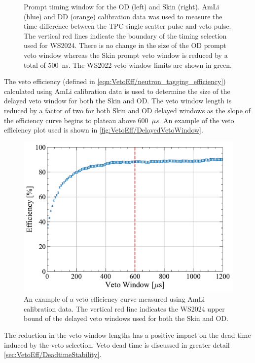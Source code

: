 \begin{figure}[!ht]
\begin{subfigure}[b]{0.49\textwidth}
		\caption{}
        \label{fig:VetoEff/skin_prompt_window}
	\end{subfigure}
	\caption{Prompt timing window for the OD (left) and Skin (right). %
    AmLi (blue) and DD (orange) calibration data was used to measure the time difference between the TPC single scatter pulse and veto pulse. 
    The vertical red lines indicate the boundary of the timing selection used for WS2024. There is no change in the size of the OD prompt veto window whereas the Skin prompt veto window is reduced by a total of 500~ns. The WS2022 veto window limits are shown in green.}
	\label{fig:VetoEff/veto_prompt_windows}
\end{figure}

The veto efficiency (defined in \ref{eqn:VetoEff/neutron_tagging_efficiency}) calculated using AmLi calibration data is used to determine the size of the delayed veto window for both the Skin and OD. The veto window length is reduced by a factor of two for both Skin and OD delayed windows as the slope of the efficiency curve begins to plateau above 600~$\mu s$. An example of the veto efficiency plot used is shown in \autoref{fig:VetoEff/DelayedVetoWindow}.
\begin{figure}[!ht]
    \centering
    \includegraphics[width=0.7\linewidth]{figures/VetoEfficiency/DelayedVetoWindow.pdf}
    \caption{An example of a veto efficiency curve measured using AmLi calibration data. The vertical red line indicates the WS2024 upper bound of the delayed veto windows used for both the Skin and OD.}
    \label{fig:VetoEff/DelayedVetoWindow}
\end{figure}

The reduction in the veto window lengths has a positive impact on the dead time induced by the veto selection. Veto dead time is discussed in greater detail \autoref{sec:VetoEff/DeadtimeStability}.


